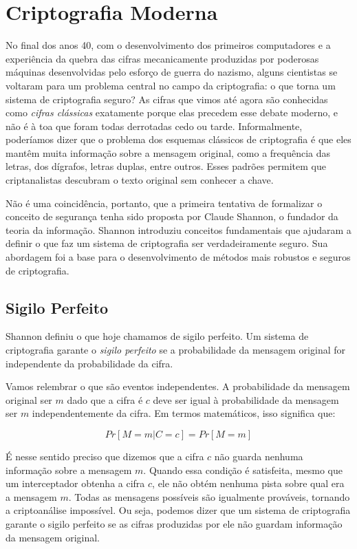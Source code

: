 \chapter{Criptografia Moderna}
\label{cha:criptografia-moderna}

No final dos anos 40, com o desenvolvimento dos primeiros computadores e a experiência da quebra das cifras mecanicamente produzidas por poderosas máquinas desenvolvidas pelo esforço de guerra do nazismo, alguns cientistas se voltaram para um problema central no campo da criptografia: o que torna um sistema de criptografia seguro?
As cifras que vimos até agora são conhecidas como {\em cifras clássicas} exatamente porque elas precedem esse debate moderno, e não é à toa que foram todas derrotadas cedo ou tarde.
Informalmente, poderíamos dizer que o problema dos esquemas clássicos de criptografia é que eles mantêm muita informação sobre a mensagem original, como a frequência das letras, dos dígrafos, letras duplas, entre outros.
Esses padrões permitem que criptanalistas descubram o texto original sem conhecer a chave.

Não é uma coincidência, portanto, que a primeira tentativa de formalizar o conceito de segurança tenha sido proposta por Claude Shannon, o fundador da teoria da informação.
Shannon introduziu conceitos fundamentais que ajudaram a definir o que faz um sistema de criptografia ser verdadeiramente seguro.
Sua abordagem foi a base para o desenvolvimento de métodos mais robustos e seguros de criptografia.

\section{Sigilo Perfeito}
\label{sec:sigilo-perfeito}

Shannon definiu o que hoje chamamos de sigilo perfeito.
Um sistema de criptografia garante o {\em sigilo perfeito} se a probabilidade da mensagem original for independente da probabilidade da cifra.

Vamos relembrar o que são eventos independentes.
A probabilidade da mensagem original ser $m$ dado que a cifra é $c$ deve ser igual à probabilidade da mensagem ser $m$ independentemente da cifra.
Em termos matemáticos, isso significa que:

\begin{displaymath}
  Pr[M = m | C = c] = Pr[M = m]
\end{displaymath}

É nesse sentido preciso que dizemos que a cifra $c$ não guarda nenhuma informação sobre a mensagem $m$.
Quando essa condição é satisfeita, mesmo que um interceptador obtenha a cifra $c$, ele não obtém nenhuma pista sobre qual era a mensagem $m$.
Todas as mensagens possíveis são igualmente prováveis, tornando a criptoanálise impossível.
Ou seja, podemos dizer que um sistema de criptografia garante o sigilo perfeito se as cifras produzidas por ele não guardam informação da mensagem original.

